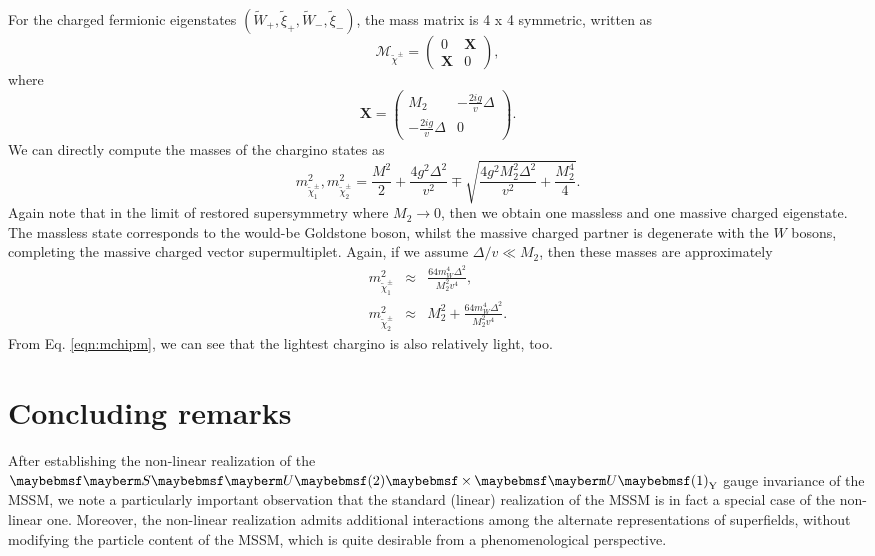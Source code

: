 For the charged fermionic eigenstates $(\tilde{W}_+,\tilde{\xi}_+,\tilde{W}_-,\tilde{\xi}_-)$, the mass matrix is 4 x 4 symmetric, written as
\begin{equation}
\mathcal{M}_{\tilde{\chi}^{\pm}}=
\begin{pmatrix} 0 & \textbf{X} \\
\textbf{X} & 0
\end{pmatrix},
\label{eqn:nonmincharginoMM1}
\end{equation}
where
\begin{equation}
\textbf{X}=
\begin{pmatrix} M_2 & -\frac{2ig}{v} \Delta \\
-\frac{2ig}{v} \Delta & 0
\end{pmatrix}.
\label{eqn:nonmincharginoMM2}
\end{equation}
We can directly compute the masses of the chargino states as
\begin{equation}
m^2_{\tilde{\chi}^{\pm}_1},m^2_{\tilde{\chi}^{\pm}_2} = \frac{M^2}{2} + \frac{4g^2\Delta^2}{v^2} \mp \sqrt{\frac{4g^2 M^2_2 \Delta^2}{v^2} + \frac{M^4_2}{4}}.
\end{equation}
Again note that in the limit of restored supersymmetry where $M_2 \rightarrow 0$, then we obtain one massless and one massive charged eigenstate. The massless state corresponds to the would-be Goldstone boson, whilst the massive charged partner is degenerate with the $W$ bosons, completing the massive charged vector supermultiplet. Again, if we assume $\Delta/v \ll M_2$, then these masses are approximately
\begin{eqnarray}
m^2_{\tilde{\chi}^{\pm}_1}&\approx& \frac{64 m^4_W\Delta^2}{M^2_2 v^4}, \label{eqn:mchipm} \\
m^2_{\tilde{\chi}^{\pm}_2}&\approx& M^2_2 + \frac{64 m^4_W\Delta^2}{M^2_2 v^4}.
\end{eqnarray}
From Eq. \ref{eqn:mchipm}, we can see that the lightest chargino is also relatively light, too.

\section{Concluding remarks}

After establishing the non-linear realization of the $\SUgroup{2} \times \Ugroup{1}_{\text{Y}}$ gauge invariance of the MSSM, we note a particularly important observation that the standard (linear) realization of the MSSM is in fact a special case of the non-linear one. Moreover, the non-linear realization admits additional interactions among the alternate representations of superfields, without modifying the particle content of the MSSM, which is quite desirable from a phenomenological perspective.

